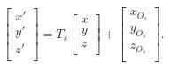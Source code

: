 \documentclass[../main.tex]{subfiles}
\begin{document}
\begin{align}\label{eq:100.2}
\left[ \begin{matrix}
x'\\
y'\\
z'\\
\end{matrix} \right] =T_s\left[ \begin{matrix}
x\\
y\\
z\\
\end{matrix} \right]+\left[ \begin{matrix}
x_{O_s}\\
y_{O_s}\\
z_{O_s}\\
\end{matrix} \right]  .
\end{align}
\end{document}
